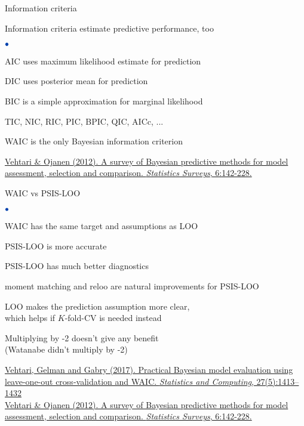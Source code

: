 \documentclass[english,t]{beamer}
\newenvironment{list1}{
   \begin{list}{$\color{list1}\bullet$}{\itemsep=6pt}}{
  \end{list}}
\begin{document}
\begin{frame}{Information criteria}

  Information criteria estimate predictive performance, too
  
\begin{list1}
  \item<+-> AIC uses maximum likelihood estimate for prediction
  \item<+-> DIC uses posterior mean for prediction
  \item<+-> BIC is a simple approximation for marginal likelihood
  \item<+-> TIC, NIC, RIC, PIC, BPIC, QIC, AICc, ...
  \item<+-> WAIC is the only Bayesian information criterion
\end{list1}

\vspace{5\baselineskip}
{\color{gray}\footnotesize\href{http://dx.doi.org/10.1214/12-SS102}{Vehtari \& Ojanen (2012). A survey of Bayesian predictive methods for model assessment, selection and comparison. \textit{Statistics Surveys}, 6:142-228.}}
\end{frame}

\begin{frame}{WAIC vs PSIS-LOO}

\begin{list1}
  \item<+-> WAIC has the same target and assumptions as LOO
  \item<+-> PSIS-LOO is more accurate 
  \item<+-> PSIS-LOO has much better diagnostics
  \item<+-> moment matching and reloo are natural improvements for PSIS-LOO
  \item<5-> LOO makes the prediction assumption more clear,\\ which
    helps if $K$-fold-CV is needed instead
  \item<6-> Multiplying by -2 doesn't give any benefit\\ (Watanabe
    didn't multiply by -2)
\end{list1}

{\color{gray}\footnotesize \href{http://link.springer.com/article/10.1007/s11222-016-9696-4}{Vehtari, Gelman and Gabry (2017). Practical Bayesian model evaluation using leave-one-out cross-validation and WAIC. \textit{Statistics and Computing}, 27(5):1413–1432}\\
\href{http://dx.doi.org/10.1214/12-SS102}{Vehtari \& Ojanen (2012). A survey of Bayesian predictive methods for model assessment, selection and comparison. \textit{Statistics Surveys}, 6:142-228.}}

\end{frame}
\end{document}
